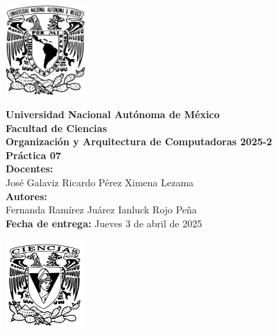 \documentclass[12pt,letterpaper]{article}
\begin{document}
\begin{center}
  \begin{minipage}{3cm}
    \begin{center}
      \includegraphics[height=3.4cm]{../unam_logo.png}
    \end{center}
  \end{minipage}\hfill
  \begin{minipage}{10cm}
    \begin{center}
      \textbf{\Large Universidad Nacional Autónoma de México}\\[0.2cm]
      \textbf{\large Facultad de Ciencias}\\[0.2cm]
      \textbf{Organización y Arquitectura de Computadoras 2025-2}\\[0.4cm]
      \textbf{\Large Práctica 07}\\[0.1cm]
      \textbf{Docentes:}\\
      José Galaviz \hspace{1em} Ricardo Pérez \hspace{1em} Ximena Lezama\\[0.3cm]
      \textbf{Autores:}\\
      Fernanda Ramírez Juárez \quad Ianluck Rojo Peña\\[0.3cm]
      \textbf{Fecha de entrega:} Jueves 3 de abril de 2025
    \end{center}
  \end{minipage}\hfill
  \begin{minipage}{3cm}
    \begin{center}
      \includegraphics[height=3.4cm]{../fc_logo.png}
    \end{center}
  \end{minipage}
\end{center}
\end{document}
